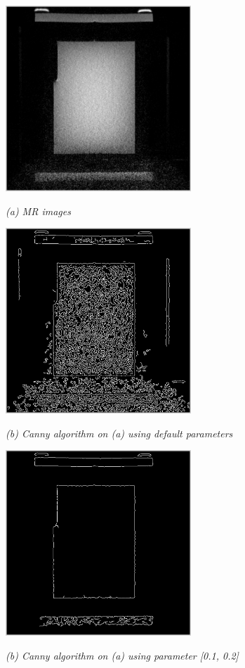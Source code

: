 \begin{figure}[htb]
  \begin{minipage}[t]{2.75in}
    \centering
    \centerline{\mbox{\includegraphics[width=2.75in]{data_extraction/images/MRI/mid_slice/112.eps}}}
    \centerline{\emph{(a) MR images}}
  \end{minipage}\medskip
  \begin{minipage}[t]{2.75in}
    \centering
    \centerline{\mbox{\includegraphics[width=2.75in]{data_extraction/images/MRI/mid_slice/112_canny_default.eps}}}
    \centerline{\emph{(b) Canny algorithm on (a) using default parameters}}
  \end{minipage}

  \begin{minipage}[t]{2.75in}
    \centering
    \centerline{\mbox{\includegraphics[width=2.75in]{data_extraction/images/MRI/mid_slice/112_canny_[0.1,0.2].eps}}}
    \centerline{\emph{(b) Canny algorithm on (a) using parameter [0.1, 0.2]}}
  \end{minipage}\medskip


\end{figure}
